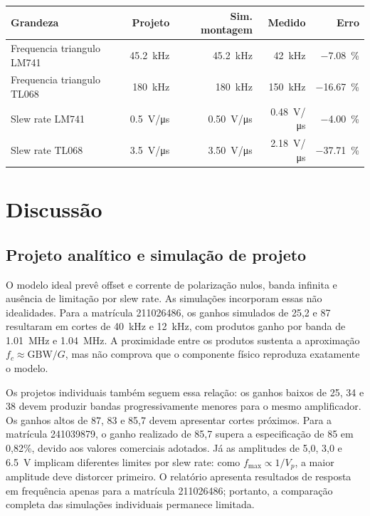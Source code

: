 \documentclass[11pt,a4paper]{article}
\begin{document}
\begin{center}
\begin{tabular}{@{}lrrrr@{}}
\toprule
\textbf{Grandeza} & \textbf{Projeto} & \textbf{Sim. montagem} & \textbf{Medido} &
\textbf{Erro} \\
\midrule
Frequencia triangulo LM741 & \SI{45,2}{\kilo\hertz} & \SI{45,2}{\kilo\hertz} & \SI{42}{\kilo\hertz} & \SI{-7,08}{\percent} \\
Frequencia triangulo TL068 & \SI{180}{\kilo\hertz} & \SI{180}{\kilo\hertz} & \SI{150}{\kilo\hertz} & \SI{-16,67}{\percent} \\
Slew rate LM741 & \SI{0,5}{\volt/\micro\second} & \SI{0,50}{\volt/\micro\second} & \SI{0,48}{\volt/\micro\second} & \SI{-4,00}{\percent} \\
Slew rate TL068 & \SI{3,5}{\volt/\micro\second} & \SI{3,50}{\volt/\micro\second} & \SI{2,18}{\volt/\micro\second} & \SI{-37,71}{\percent} \\
\bottomrule
\end{tabular}
\end{center}

\section{Discussão}

\subsection{Projeto analítico e simulação de projeto}

O modelo ideal prevê offset e corrente de polarização nulos, banda infinita e ausência de limitação por slew rate. As simulações incorporam essas não idealidades. Para a matrícula 211026486, os ganhos simulados de 25,2 e 87 resultaram em cortes de \SI{40}{\kilo\hertz} e \SI{12}{\kilo\hertz}, com produtos ganho por banda de \SI{1,01}{\mega\hertz} e \SI{1,04}{\mega\hertz}. A proximidade entre os produtos sustenta a aproximação $f_c \approx \mathrm{GBW}/G$, mas não comprova que o componente físico reproduza exatamente o modelo.

Os projetos individuais também seguem essa relação: os ganhos baixos de 25, 34 e 38 devem produzir bandas progressivamente menores para o mesmo amplificador. Os ganhos altos de 87, 83 e 85,7 devem apresentar cortes próximos. Para a matrícula 241039879, o ganho realizado de 85,7 supera a especificação de 85 em 0,82\%, devido aos valores comerciais adotados. Já as amplitudes de 5,0, 3,0 e \SI{6,5}{\volt} implicam diferentes limites por slew rate: como $f_{\max} \propto 1/V_p$, a maior amplitude deve distorcer primeiro. O relatório apresenta resultados de resposta em frequência apenas para a matrícula 211026486; portanto, a comparação completa das simulações individuais permanece limitada.
\end{document}
